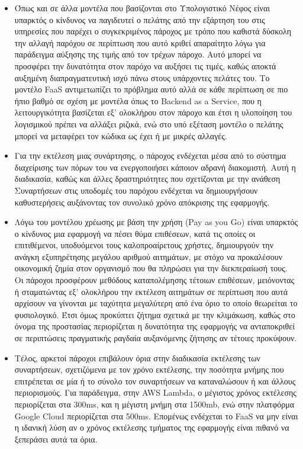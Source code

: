 \documentclass{article}
\begin{document}
\begin{itemize}
\item Όπως και σε άλλα μοντέλα που βασίζονται στο Υπολογιστικό Νέφος είναι υπαρκτός ο κίνδυνος να παγιδευτεί ο πελάτης από την εξάρτηση του στις υπηρεσίες που παρέχει ο συγκεκριμένος πάροχος με τρόπο που καθιστά δύσκολη την αλλαγή παρόχου σε περίπτωση που αυτό κριθεί απαραίτητο λόγω για παράδειγμα αύξησης της τιμής από τον τρέχων πάροχο. Αυτό μπορεί να προσφέρει την δυνατότητα στον παρόχο να αυξήσει τις τιμές, καθώς αποκτά αυξημένη διαπραγματευτική ισχύ πάνω στους υπάρχοντες πελάτες του. Το μοντέλο FaaS αντιμετωπίζει το πρόβλημα αυτό αλλά σε κάθε περίπτωση σε πιο ήπιο βαθμό σε σχέση με μοντέλα όπως το  Backend as a Service,  που η λειτουργικότητα βασίζεται εξ' ολοκλήρου στον πάροχο και έτσι η υλοποίηση του λογισμικού πρέπει να αλλάξει ριζικά, ενώ στο υπό εξέταση μοντέλο ο πελάτης μπορεί να μεταφέρει τον κώδικα ως έχει ή με μικρές αλλαγές.
\item Για την εκτέλεση μιας συνάρτησης, ο πάροχος ενδέχεται μέσα από το σύστημα διαχείρισης των πόρων του να ενεργοποιήσει κάποιον αδρανή διακομιστή. Αυτή η διαδικασία, καθώς και άλλες δραστηριότητες που σχετίζονται με την ανάθεση Συναρτήσεων στις υποδομές του παρόχου ενδέχεται να δημιουργήσουν καθυστερήσεις αυξάνοντας τον συνολικό χρόνο απόκρισης της εφαρμογής.
\item Λόγω του μοντέλου χρέωσης με βάση την χρήση (Pay as you Go) είναι υπαρκτός ο κίνδυνος μια εφαρμογή να πέσει θύμα επιθέσεων, κατά τις οποίες οι επιτιθέμενοι, υποδυόμενοι τους καλοπροαίρετους χρήστες, δημιουργούν την ανάγκη εξυπηρέτησης μεγάλου αριθμού αιτημάτων, με στόχο να προκαλέσουν οικονομική ζημία στον οργανισμό που θα πληρώσει για την διεκπεραίωσή τους. Οι πάροχοι προσφέρουν μεθόδους καταπολέμησης τέτοιων επιθέσεων, μειόνοντας ή σταματώντας εξ' ολοκλήρου την εκτέλεση αιτημάτων σε περίπτωση που αυτά αρχίσουν να γίνονται με ταχύτητα μεγαλύτερη από ένα όριο το οποίο θεωρείται το φυσιολογικό. Έτσι όμως προκύπτει ζήτημα σχετικά με την κλιμάκωση, καθώς στο όνομα της προστασίας περιορίζεται η δυνατότητα της εφαρμογής να ανταποκριθεί σε περιπτώσεις πραγματικής ραγδαία αυξανόμενης ζήτησης αν τέτοιες προκύψουν.
\item Τέλος, αρκετοί πάροχοι επιβάλουν όρια στην διαδικασία εκτέλεσης των συναρτήσεων, σχετιζόμενα με τον χρόνο εκτέλεσης, την ποσότητα μνήμης που επιτρέπεται σε μία ή το σύνολο τον συναρτήσεων να καταναλώσουν ή και άλλους περιορισμούς. Για παράδειγμα, στην AWS Lambda, ο μέγιστος χρόνος εκτέλεσης περιορίζεται στα 300ms, και η μέγιστη μνήμη στα 1500mb, ενώ στην πλατφόρμα Google Cloud περιορίζεται στα 500ms. Επομένως ενδέχεται το FaaS να μην είναι η ιδανική λύση αν ο χρόνος εκτέλεσης τμήματος της εφαρμογής είναι πιθανό να ξεπεράσει αυτά τα όρια. 
\end{itemize}
\end{document}
